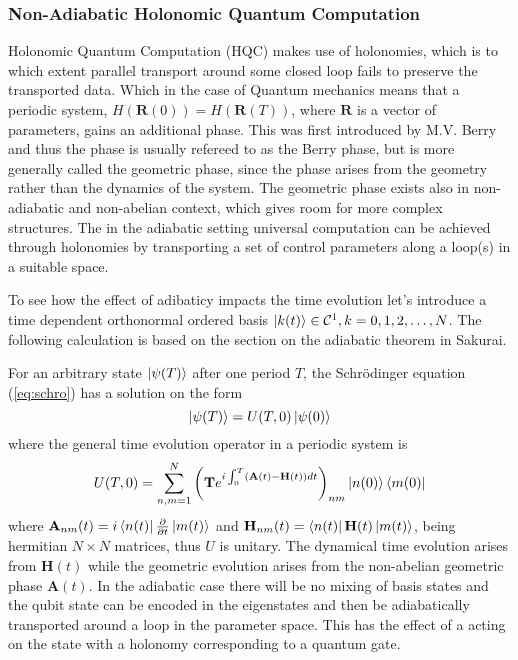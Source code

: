 \subsubsection{Non-Adiabatic Holonomic Quantum Computation}
Holonomic Quantum Computation (HQC) makes use of holonomies, which is to which extent parallel transport around some closed loop fails to preserve the transported data. Which in the case of Quantum mechanics means that a periodic system, $H(\mathbf{R}(0)) = H(\mathbf{R}(T))$, where $\mathbf{R}$ is a vector of parameters, gains an additional phase. This was first introduced by M.V. Berry\cite{berry} and thus the phase is usually refereed to as the Berry phase, but is more generally called the geometric phase, since the phase arises from the geometry rather than the dynamics of the system. The geometric phase exists also in non-adiabatic and non-abelian context, which gives room for more complex structures\cite{anandan1,anandan2,zee}. 
The in the adiabatic setting universal computation can be achieved through holonomies by transporting a set of control parameters along a loop(s) in a suitable space\cite{HQC}.

To see how the effect of adibaticy impacts the time evolution let's introduce a time dependent orthonormal ordered basis $\ket{k(t)} \in \mathcal{C}^1, k = 0,1,2,\dots,N$. The following calculation is based on the section on the adiabatic theorem in Sakurai\cite{Sakurai}.

For an arbitrary state $\ket{\psi(T)}$ after one period $T$, the Schrödinger equation (\ref{eq:schro}) has a solution on the form 
\begin{equation}
\label{eq:gen_sol}
\ket{\psi(T)} = U(T,0)\ket{\psi(0)}
\end{equation}
where the general time evolution operator in a periodic system is 
\begin{equation}
\label{eq:unitary}
U(T,0) = \sum_{n,m = 1}^N\left(\mathbf{T}e^{i\int_0^T \left(\mathbf{A}(t) - \mathbf{H}(t)\right) dt}\right)_{nm}\ket{n(0)}\bra{m(0)}
\end{equation}
where $\mathbf{A}_{nm}(t) = i\bra{n(t)}\pdv{}{t}\ket{m(t)}$ and
$\mathbf{H}_{nm}(t) = \bra{n(t)}\mathbf{H}(t)\ket{m(t)}$, being hermitian $N\times N$ matrices, thus $U$ is unitary.
The dynamical time evolution arises from $\mathbf{H}(t)$ while the geometric evolution arises from the non-abelian geometric phase $\mathbf{A}(t)$. In the adiabatic case\cite{adiabatensatz} there will be no mixing of basis states and the qubit state can be encoded in the eigenstates and then be adiabatically transported around a loop in the parameter space. This has the effect of a acting on the state with a holonomy corresponding to a quantum gate\cite{HQC}. 


